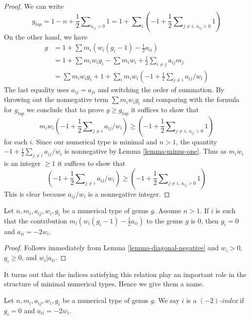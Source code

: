 \begin{proof}
We can write
$$
g_{top} = 1 - n + \frac{1}{2}\sum\nolimits_{a_{ij} > 0} 1 =
1 + \sum\nolimits_i (-1 +
\frac{1}{2}\sum\nolimits_{j \not = i,\ a_{ij} > 0} 1) 
$$
On the other hand, we have
\begin{align*}
g & =
1 + \sum m_i(w_i(g_i - 1) - \frac{1}{2} a_{ii}) \\
& =
1 + \sum m_iw_ig_i - \sum m_iw_i +
\frac{1}{2} \sum\nolimits_{i \not = j} a_{ij}m_j \\
& =
\sum m_iw_ig_i + 1 +
\sum\nolimits_i m_iw_i(-1 + \frac{1}{2} \sum\nolimits_{j \not = i} a_{ij}/w_i)
\end{align*}
The last equality uses $a_{ij} = a_{ji}$ and switching the order of
summation. By throwing out the nonnegative term $\sum m_iw_ig_i$ and
comparing with the formula for $g_{top}$ we conclude
that to prove $g \geq g_{top}$ it suffices to show that
$$
m_iw_i(-1 + \frac{1}{2} \sum\nolimits_{j \not = i} a_{ij}/w_i) \geq
(-1 + \frac{1}{2}\sum\nolimits_{j \not = i,\ a_{ij} > 0} 1)
$$
for each $i$. Since our numerical type is minimal and $n > 1$, the
quantity $-1 + \frac{1}{2} \sum\nolimits_{j \not = i} a_{ij}/w_i$
is nonnegative by Lemma \ref{lemma-minus-one}.
Thus as $m_iw_i$ is an integer $\geq 1$
it suffices to show that
$$
(-1 + \frac{1}{2} \sum\nolimits_{j \not = i} a_{ij}/w_i) \geq
(-1 + \frac{1}{2}\sum\nolimits_{j \not = i,\ a_{ij} > 0} 1)
$$
This is clear because $a_{ij}/w_i$ is a nonnegative integer.
\end{proof}

\begin{lemma}
\label{lemma-minus-two}
Let $n, m_i, a_{ij}, w_i, g_i$ be a numerical type of genus $g$.
Assume $n > 1$. If $i$ is such that the contribution
$m_i(w_i(g_i - 1) - \frac{1}{2} a_{ii})$
to the genus $g$ is $0$, then $g_i = 0$ and $a_{ii} = -2w_i$.
\end{lemma}

\begin{proof}
Follows immediately from Lemma \ref{lemma-diagonal-negative} and
$w_i > 0$, $g_i \geq 0$, and $w_i | a_{ii}$.
\end{proof}

\noindent
It turns out that the indices satisfying this relation play an
important role in the structure of minimal numerical types.
Hence we give them a name.

\begin{definition}
\label{definition-type-minus-two}
Let $n, m_i, a_{ij}, w_i, g_i$ be a numerical type of genus $g$.
We say $i$ is a {\it $(-2)$-index} if $g_i = 0$ and $a_{ii} = -2w_i$.
\end{definition}

